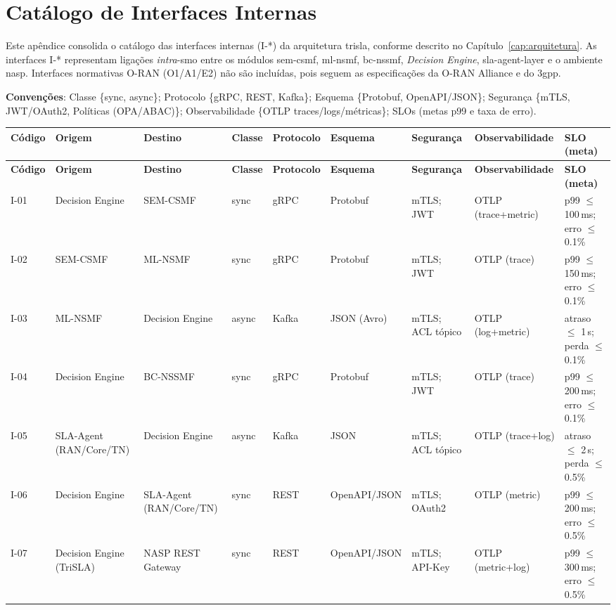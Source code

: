 \chapter{Catálogo de Interfaces Internas}
\label{ap:catalogo-interfaces}

Este apêndice consolida o catálogo das interfaces internas (I-*) da arquitetura \ac{trisla}, conforme descrito no Capítulo~\ref{cap:arquitetura}.  
As interfaces I-* representam ligações \textit{intra}-\ac{smo} entre os módulos \ac{sem-csmf}, \ac{ml-nsmf}, \ac{bc-nssmf}, \textit{Decision Engine}, \ac{sla-agent-layer} e o ambiente \ac{nasp}.  
Interfaces normativas O-RAN (O1/A1/E2) não são incluídas, pois seguem as especificações da O-RAN Alliance e do \ac{3gpp}.

\medskip
\noindent\textbf{Convenções}: Classe \{sync, async\}; Protocolo \{gRPC, REST, Kafka\}; Esquema \{Protobuf, OpenAPI/JSON\}; Segurança \{mTLS, JWT/OAuth2, Políticas (OPA/ABAC)\}; Observabilidade \{OTLP traces/logs/métricas\}; SLOs (metas p99 e taxa de erro).

{\scriptsize
\setlength{\tabcolsep}{3pt}
\begin{longtable}{L{1.2cm} L{2.6cm} L{2.6cm} L{1.1cm} L{1.4cm} L{1.8cm} L{2.1cm} L{2.0cm} L{2.2cm}}
\toprule
\textbf{Código} & \textbf{Origem} & \textbf{Destino} & \textbf{Classe} & \textbf{Protocolo} & \textbf{Esquema} & \textbf{Segurança} & \textbf{Observabilidade} & \textbf{SLO (meta)} \\
\midrule
\endfirsthead
\toprule
\textbf{Código} & \textbf{Origem} & \textbf{Destino} & \textbf{Classe} & \textbf{Protocolo} & \textbf{Esquema} & \textbf{Segurança} & \textbf{Observabilidade} & \textbf{SLO (meta)} \\
\midrule
\endhead
I-01 & Decision Engine & SEM-CSMF & sync & gRPC & Protobuf & mTLS; JWT & OTLP (trace+metric) & p99 $\leq$ 100\,ms; erro $\leq$ 0.1\% \\
I-02 & SEM-CSMF & ML-NSMF & sync & gRPC & Protobuf & mTLS; JWT & OTLP (trace) & p99 $\leq$ 150\,ms; erro $\leq$ 0.1\% \\
I-03 & ML-NSMF & Decision Engine & async & Kafka & JSON (Avro) & mTLS; ACL tópico & OTLP (log+metric) & atraso $\leq$ 1\,s; perda $\leq$ 0.1\% \\
I-04 & Decision Engine & BC-NSSMF & sync & gRPC & Protobuf & mTLS; JWT & OTLP (trace) & p99 $\leq$ 200\,ms; erro $\leq$ 0.1\% \\
I-05 & SLA-Agent (RAN/Core/TN) & Decision Engine & async & Kafka & JSON & mTLS; ACL tópico & OTLP (trace+log) & atraso $\leq$ 2\,s; perda $\leq$ 0.5\% \\
I-06 & Decision Engine & SLA-Agent (RAN/Core/TN) & sync & REST & OpenAPI/JSON & mTLS; OAuth2 & OTLP (metric) & p99 $\leq$ 200\,ms; erro $\leq$ 0.5\% \\
I-07 & Decision Engine (TriSLA) & NASP REST Gateway & sync & REST & OpenAPI/JSON & mTLS; API-Key & OTLP (metric+log) & p99 $\leq$ 300\,ms; erro $\leq$ 0.5\% \\
\bottomrule
\end{longtable}
}
\FloatBarrier
